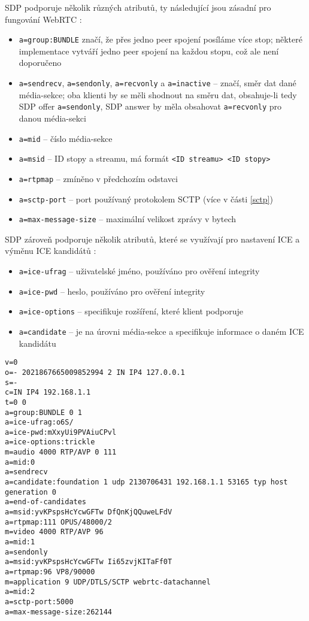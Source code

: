 SDP podporuje několik různých atributů, ty následující jsou zásadní pro fungování
WebRTC \cite{WebRTCForTheCurious,IETF-RFC8866,IETF-RFC5888,IETF-RFC8841}:
\begin{itemize}
    \item \texttt{a=group:BUNDLE} značí, že přes jedno peer spojení
          posíláme více stop; některé implementace vytváří jedno peer spojení na
          každou stopu, což ale není doporučeno
    \item \texttt{a=sendrecv}, \texttt{a=sendonly},
          \texttt{a=recvonly} a \texttt{a=inactive} --
          značí, směr dat dané média-sekce; oba klienti by se měli shodnout na
          směru dat, obsahuje-li tedy SDP offer \texttt{a=sendonly},
          SDP answer by měla obsahovat \texttt{a=recvonly} pro danou
          média-sekci
    \item \texttt{a=mid} -- číslo média-sekce
    \item \texttt{a=msid} -- ID stopy a streamu, má formát
          \texttt{<ID streamu> <ID stopy>}
    \item \texttt{a=rtpmap} -- zmíněno v předchozím odstavci
    \item \texttt{a=sctp-port} -- port používaný protokolem SCTP (více
          v části \ref{sctp})
    \item \texttt{a=max-message-size} -- maximální velikost zprávy v
          bytech
\end{itemize}

SDP zároveň podporuje několik atributů, které se využívají pro nastavení ICE a
výměnu ICE kandidátů \cite{WebRTCForTheCurious,IETF-RFC8839}:
\begin{itemize}
    \item \texttt{a=ice-ufrag} -- uživatelské jméno, používáno pro
          ověření integrity
    \item \texttt{a=ice-pwd} -- heslo, používáno pro ověření integrity
    \item \texttt{a=ice-options} -- specifikuje rozšíření, které
          klient podporuje
    \item \texttt{a=candidate} -- je na úrovni média-sekce a
          specifikuje informace o daném ICE kandidátu
\end{itemize}

\begin{verbatim}
v=0
o=- 2021867665009852994 2 IN IP4 127.0.0.1
s=-
c=IN IP4 192.168.1.1
t=0 0
a=group:BUNDLE 0 1
a=ice-ufrag:o6S/
a=ice-pwd:mXxyUi9PVAiuCPvl
a=ice-options:trickle
m=audio 4000 RTP/AVP 0 111
a=mid:0
a=sendrecv
a=candidate:foundation 1 udp 2130706431 192.168.1.1 53165 typ host generation 0
a=end-of-candidates
a=msid:yvKPspsHcYcwGFTw DfQnKjQQuweLFdV
a=rtpmap:111 OPUS/48000/2
m=video 4000 RTP/AVP 96
a=mid:1
a=sendonly
a=msid:yvKPspsHcYcwGFTw Ii65zvjKITaFf0T
a=rtpmap:96 VP8/90000
m=application 9 UDP/DTLS/SCTP webrtc-datachannel
a=mid:2
a=sctp-port:5000
a=max-message-size:262144
\end{verbatim}

